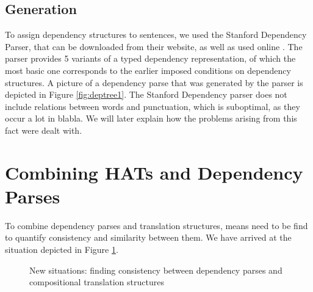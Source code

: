 \documentclass{report}
\begin{document}
\subsection{Generation}

To assign dependency structures to sentences, we used the Stanford Dependency Parser, that can be downloaded from their website, as well as used online  \citep{de2006generating}. The parser provides 5 variants of a typed dependency representation, of which the most basic one corresponds to the earlier imposed conditions on dependency structures. A picture of a dependency parse that was  generated by the parser is depicted in Figure \ref{fig:deptree1}. The Stanford Dependency parser does not include relations between words and punctuation, which is suboptimal, as they occur a lot in blabla. We will later explain how the problems arising from this fact were dealt with.

\section{Combining HATs and Dependency Parses}

To combine dependency parses and translation structures, means need to be find to quantify consistency and similarity between them. We have arrived at the situation depicted in Figure \ref{fig:depshats}.

\begin{figure}[!ht]
\centering
{}
\caption{New situations: finding consistency between dependency parses and compositional translation structures}\label{fig:depshats}
\end{figure}
\end{document}
